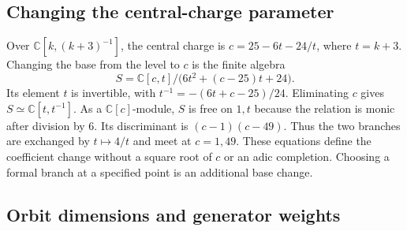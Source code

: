 \subsection{Changing the central-charge parameter}

Over $\mathbb C[k,(k+3)^{-1}]$, the central charge is $c=25-6t-24/t$, where $t=k+3$.
Changing the base from the level to $c$ is the finite algebra
\begin{equation}\label{eq:cbc28-central-base}
 S=\mathbb C[c,t]/\bigl(6t^2+(c-25)t+24\bigr).
\end{equation}
Its element $t$ is invertible, with $t^{-1}=-(6t+c-25)/24$.
Eliminating $c$ gives $S\simeq\mathbb C[t,t^{-1}]$.
As a $\mathbb C[c]$-module, $S$ is free on $1,t$ because the relation is monic after division by $6$.
Its discriminant is $(c-1)(c-49)$.
Thus the two branches are exchanged by $t\mapsto4/t$ and meet at $c=1,49$.
These equations define the coefficient change without a square root of $c$ or an adic completion.
Choosing a formal branch at a specified point is an additional base change.

\subsection{Orbit dimensions and generator weights}

